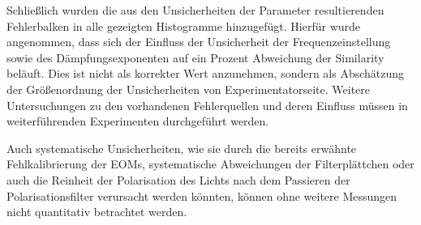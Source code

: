 Schließlich wurden die aus den Unsicherheiten der Parameter resultierenden 
Fehlerbalken in alle gezeigten Histogramme hinzugefügt. Hierfür wurde
angenommen, dass sich der Einfluss der Unsicherheit der Frequenzeinstellung
sowie des Dämpfungsexponenten auf ein Prozent Abweichung der Similarity
beläuft. Dies ist nicht als korrekter Wert anzunehmen, sondern als Abschätzung
der Größenordnung der Unsicherheiten von Experimentatorseite. Weitere
Untersuchungen zu den vorhandenen Fehlerquellen und deren Einfluss müssen in
weiterführenden Experimenten durchgeführt werden.

Auch systematische Unsicherheiten, wie sie durch die bereits erwähnte
Fehlkalibrierung der EOMs, systematische Abweichungen der Filterplättchen oder
auch die Reinheit der Polarisation des Lichts nach dem Passieren der
Polarisationsfilter verursacht werden könnten, können ohne weitere Messungen
nicht quantitativ betrachtet werden.